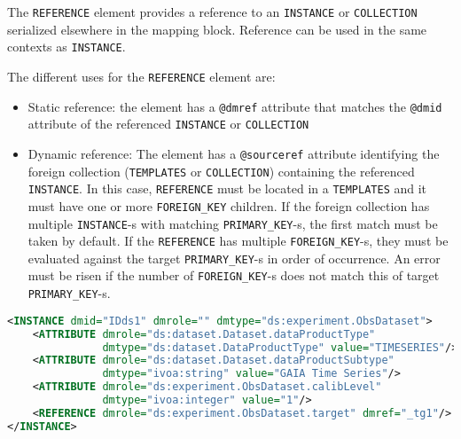 The \texttt{REFERENCE} element provides a reference to an \texttt{INSTANCE} or \texttt{COLLECTION} serialized 
elsewhere in the mapping block.
Reference can be used in the same contexts as \texttt{INSTANCE}.

The different uses for the \texttt{REFERENCE} element are:

\begin{itemize}
    \item Static reference: the element has a \texttt{@dmref} attribute that matches the \texttt{@dmid} 
          attribute of the referenced \texttt{INSTANCE} or \texttt{COLLECTION} 
    \item Dynamic reference: The element has a \texttt{@sourceref} attribute identifying the foreign 
          collection (\texttt{TEMPLATES} or \texttt{COLLECTION}) containing the referenced \texttt{INSTANCE}.
          In this case, \texttt{REFERENCE} must be located in a \texttt{TEMPLATES} and it must have one 
          or more \texttt{FOREIGN\_KEY} children. 
          If the foreign collection has multiple \texttt{INSTANCE}-s with matching \texttt{PRIMARY\_KEY}-s, 
          the first match must be taken by default.
          If the \texttt{REFERENCE} has multiple \texttt{FOREIGN\_KEY}-s, they must be evaluated 
          against the target \texttt{PRIMARY\_KEY}-s in order of occurrence.
          An error must be risen if the number of \texttt{FOREIGN\_KEY}-s does not match this of target 
          \texttt{PRIMARY\_KEY}-s.
\end{itemize}

\begin{lstlisting}[caption={Simple \texttt{REFERENCE}, to be replaced with the \texttt{INSTANCE} having \texttt{@dmid=\_tg1} (see line~\ref{REFERENCE_snippet_1} in Appendix~\ref{appendix_A}).},language=XML]
<INSTANCE dmid="IDds1" dmrole="" dmtype="ds:experiment.ObsDataset">
    <ATTRIBUTE dmrole="ds:dataset.Dataset.dataProductType" 
               dmtype="ds:dataset.DataProductType" value="TIMESERIES"/>
    <ATTRIBUTE dmrole="ds:dataset.Dataset.dataProductSubtype" 
               dmtype="ivoa:string" value="GAIA Time Series"/>
    <ATTRIBUTE dmrole="ds:experiment.ObsDataset.calibLevel" 
               dmtype="ivoa:integer" value="1"/>
    <REFERENCE dmrole="ds:experiment.ObsDataset.target" dmref="_tg1"/>
</INSTANCE>

\end{lstlisting}

